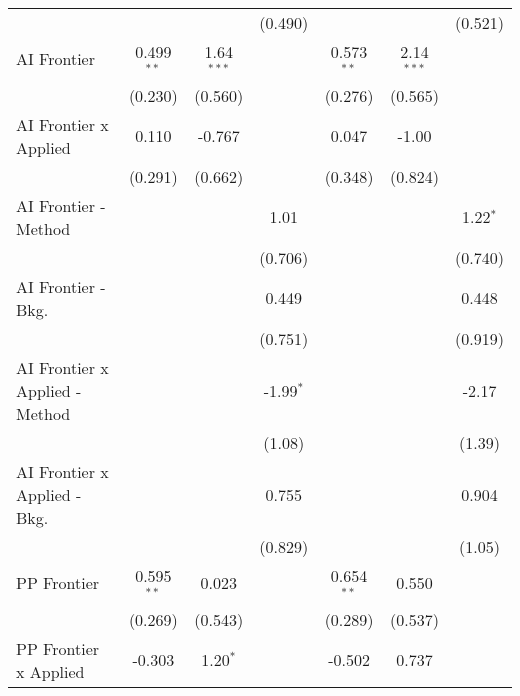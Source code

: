 \begin{tabular}{lcccccc}
                                  &              &               & (0.490)       &              &               & (0.521)\\   
   AI Frontier                    & 0.499$^{**}$ & 1.64$^{***}$  &               & 0.573$^{**}$ & 2.14$^{***}$  &   \\   
                                  & (0.230)      & (0.560)       &               & (0.276)      & (0.565)       &   \\   
   AI Frontier x Applied          & 0.110        & -0.767        &               & 0.047        & -1.00         &   \\   
                                  & (0.291)      & (0.662)       &               & (0.348)      & (0.824)       &   \\   
   AI Frontier - Method           &              &               & 1.01          &              &               & 1.22$^{*}$\\   
                                  &              &               & (0.706)       &              &               & (0.740)\\   
   AI Frontier - Bkg.             &              &               & 0.449         &              &               & 0.448\\   
                                  &              &               & (0.751)       &              &               & (0.919)\\   
   AI Frontier x Applied - Method &              &               & -1.99$^{*}$   &              &               & -2.17\\   
                                  &              &               & (1.08)        &              &               & (1.39)\\   
   AI Frontier x Applied - Bkg.   &              &               & 0.755         &              &               & 0.904\\   
                                  &              &               & (0.829)       &              &               & (1.05)\\   
   PP Frontier                    & 0.595$^{**}$ & 0.023         &               & 0.654$^{**}$ & 0.550         &   \\   
                                  & (0.269)      & (0.543)       &               & (0.289)      & (0.537)       &   \\   
   PP Frontier x Applied          & -0.303       & 1.20$^{*}$    &               & -0.502       & 0.737         &   \\   

\end{tabular}
